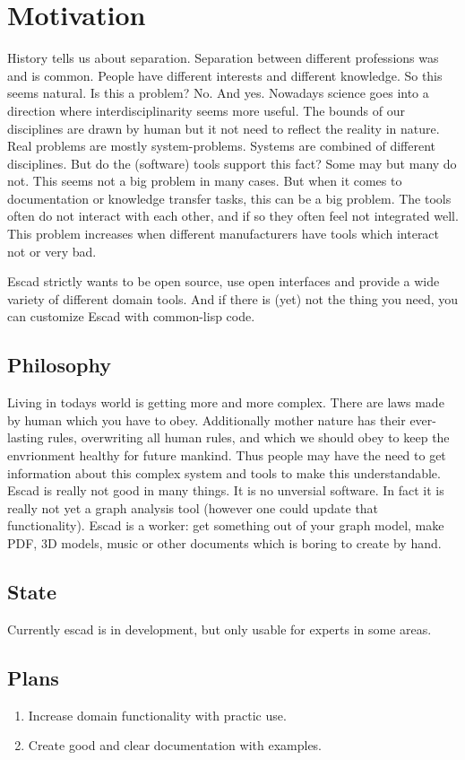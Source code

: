 \documentclass[a4paper, 12pt, openany]{scrbook}
\begin{document}
\chapter{Motivation}
History tells us about separation. Separation between different professions was and is common. People have different interests and different knowledge. So this seems natural. Is this a problem? No. And yes. Nowadays science goes into a direction where interdisciplinarity seems more useful. The bounds of our disciplines are drawn by human but it not need to reflect the reality in nature. Real problems are mostly system-problems. Systems are combined of different disciplines. But do the (software) tools support this fact? Some may but many do not. This seems not a big problem in many cases. But when it comes to documentation or knowledge transfer tasks, this can be a big problem. The tools often do not interact with each other, and if so they often feel not integrated well. This problem increases when different manufacturers have tools which interact not or very bad.

Escad strictly wants to be open source, use open interfaces and provide a wide variety of different domain tools. And if there is (yet) not the thing you need, you can customize Escad with common-lisp code.
\section{Philosophy}
Living in todays world is getting more and more complex. There are laws made by human which you have to obey. Additionally mother nature has their ever-lasting rules, overwriting all human rules, and which we should obey to keep the envrionment healthy for future mankind. Thus people may have the need to get information about this complex system and tools to make this understandable. Escad is really not good in many things. It is no unversial software. In fact it is really not yet a graph analysis tool (however one could update that functionality). Escad is a worker: get something out of your graph model, make PDF, 3D models, music or other documents which is boring to create by hand.
\section{State}
Currently escad is in development, but only usable for experts in some areas.
\section{Plans}
\begin{enumerate}
\item Increase domain functionality with practic use.
\item Create good and clear documentation with examples.
\end{enumerate}
\end{document}

